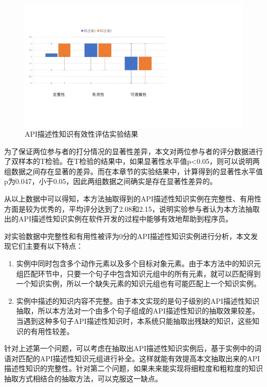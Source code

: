 \begin{figure}[htb]
    \centering
    \includegraphics[width=\textwidth]{image/youxiaoxing.pdf}
    \caption{API描述性知识有效性评估实验结果} 
    \label{fig:fig2} 
\end{figure}

为了保证两位参与者的打分情况的显著性差异，本文对两位参与者的评分数据进行了双样本的T检验。在T检验的结果中，如果显著性水平值p<0.05，则可以说明两组数据之间存在显著的差异。而在本章节的实验结果中，计算得到的显著性水平值p为0.047，小于0.05，因此两组数据之间确实是存在显著性差异的。

从以上数据中可以得知，本方法抽取得到的API描述性知识实例在完整性、有用性方面是较为优秀的，平均评分达到了2.08和2.15，说明实验参与者认为本方法抽取出的API描述性知识实例在软件开发的过程中能够有效地帮助到程序员。

对实验数据中完整性和有用性被评为0分的API描述性知识实例进行分析，本文发现它们主要有以下特点：

\begin{enumerate}
    \item 实例中同时包含多个动作元素以及多个目标对象元素。由于本方法中的知识元组匹配环节中，只要一个句子中包含知识元组中的所有元素，就可以匹配得到一个知识实例，所以一个缺失元素的知识元组也有可能匹配上一个知识实例。
    \item 实例中描述的知识内容不完整。由于本文实现的是句子级别的API描述性知识抽取，所以本方法对一个由多个句子组成的API描述性知识的抽取效果较差。当遇到这种多句子API描述性知识时，本系统只能抽取出残缺的知识，这些知识的有用性较差。
\end{enumerate}

针对上述第一个问题，可以考虑在抽取出API描述性知识实例后，基于实例中的词语对匹配的API描述性知识元组进行补全。这样就能有效提高本文抽取出来的API描述性知识的完整性。针对第二个问题，如果未来能实现将细粒度和粗粒度的知识抽取方式相结合的抽取方法，可以克服这一缺点。


